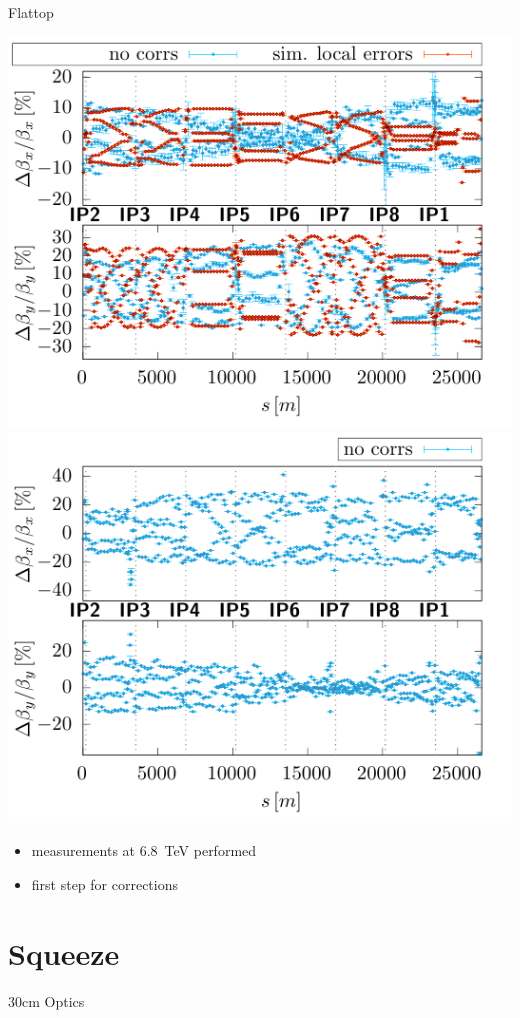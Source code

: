 \documentclass[11pt,usenames,dvipsnames,aspectration=169]{beamer}
\begin{document}
\begin{frame}{Flattop}

\includegraphics[width=0.49\linewidth]{images/flattop/b1_bb.pdf}
\hfill
\includegraphics[width=0.49\linewidth]{images/flattop/b2_bb.pdf}

\begin{itemize}
    \item measurements at \SI{6.8}{TeV} performed
    \item first step for corrections
\end{itemize}

\end{frame}

\section{Squeeze}

\begin{frame}{30cm Optics}
    
\end{frame}

\end{document}
